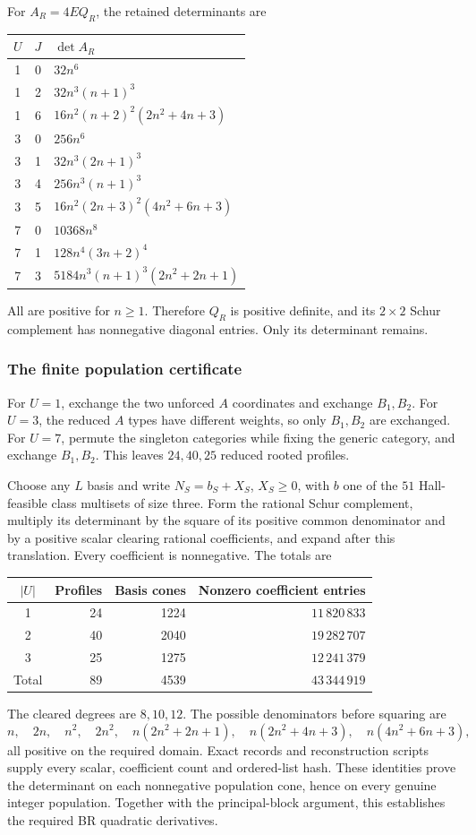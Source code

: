 \documentclass[11pt,a4paper]{article}
\theoremstyle{remark}\newtheorem{remark}[theorem]{Remark}
\begin{document}
For $A_R=4E Q_R$, the retained determinants are
\begin{center}
\begin{tabular}{ccl}
\hline
$U$&$J$&$\det A_R$\\\hline
1&0&$32n^6$\\
1&2&$32n^3(n+1)^3$\\
1&6&$16n^2(n+2)^2(2n^2+4n+3)$\\
3&0&$256n^6$\\
3&1&$32n^3(2n+1)^3$\\
3&4&$256n^3(n+1)^3$\\
3&5&$16n^2(2n+3)^2(4n^2+6n+3)$\\
7&0&$10368n^8$\\
7&1&$128n^4(3n+2)^4$\\
7&3&$5184n^3(n+1)^3(2n^2+2n+1)$\\\hline
\end{tabular}
\end{center}
All are positive for $n\ge1$. Therefore $Q_R$ is positive definite, and its
$2\times2$ Schur complement has nonnegative diagonal entries. Only its
determinant remains.

\subsubsection{The finite population certificate}
For $U=1$, exchange the two unforced $A$ coordinates and exchange $B_1,B_2$.
For $U=3$, the reduced $A$ types have different weights, so only $B_1,B_2$
are exchanged. For $U=7$, permute the singleton categories while fixing the
generic category, and exchange $B_1,B_2$. This leaves $24,40,25$ reduced
rooted profiles.

Choose any $L$ basis and write $N_S=b_S+X_S$, $X_S\ge0$, with $b$ one of the
$51$ Hall-feasible class multisets of size three. Form the rational Schur
complement, multiply its determinant by the square of its positive common
denominator and by a positive scalar clearing rational coefficients, and
expand after this translation. Every coefficient is nonnegative. The totals are
\begin{center}
\begin{tabular}{crrr}
\hline
$|U|$&Profiles&Basis cones&Nonzero coefficient entries\\\hline
1&24&1224&$11\,820\,833$\\
2&40&2040&$19\,282\,707$\\
3&25&1275&$12\,241\,379$\\\hline
Total&89&4539&$43\,344\,919$\\\hline
\end{tabular}
\end{center}
The cleared degrees are $8,10,12$. The possible denominators before squaring are
\[
 n,\quad2n,\quad n^2,\quad2n^2,\quad
 n(2n^2+2n+1),\quad n(2n^2+4n+3),\quad n(4n^2+6n+3),
\]
all positive on the required domain. Exact records and reconstruction scripts
supply every scalar, coefficient count and ordered-list hash.
These identities prove the determinant on each nonnegative population cone,
hence on every genuine integer population. Together with the principal-block
argument, this establishes the required BR quadratic derivatives.
\end{document}
